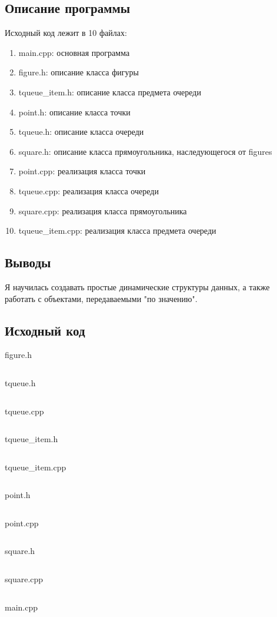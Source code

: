 \documentclass[12pt]{article}
\begin{document}
\subsection*{Описание программы}

Исходный код лежит в 10 файлах:
\begin{enumerate}
\item main.cpp: основная программа

\item figure.h:    описание класса фигуры
\item tqueue\_item.h:    описание класса предмета очереди
\item point.h:     описание класса точки
\item tqueue.h:  описание класса очереди
\item square.h: описание класса прямоугольника, наследующегося от figures

\item point.cpp:     реализация класса точки
\item tqueue.cpp:  реализация класса очереди
\item square.cpp: реализация класса прямоугольника
\item tqueue\_item.cpp:    реализация класса предмета очереди

\end{enumerate}

\subsection*{Выводы}

Я научилась создавать простые динамические структуры данных, а также работать с объектами, передаваемыми "по значению".
\pagebreak



\subsection*{Исходный код}

{\Huge figure.h}
\inputminted{C++}{figure.h}
\pagebreak

{\Huge tqueue.h}
\inputminted{C++}{tqueue.h}
\pagebreak

{\Huge tqueue.cpp}
\inputminted{C++}{tqueue.cpp}
\pagebreak

{\Huge tqueue\_item.h}
\inputminted{C++}{tqueueitem.h}
\pagebreak

{\Huge tqueue\_item.cpp}
\inputminted{C++}{tqueueitem.cpp}
\pagebreak
    
{\Huge point.h}
\inputminted{C++}{point.h}
    \pagebreak

{\Huge point.cpp}
\inputminted{C++}{point.cpp}
    \pagebreak

{\Huge square.h}
\inputminted{C++}{square.h}
\pagebreak

{\Huge square.cpp}
\inputminted{C++}{square.cpp}
\pagebreak
    
{\Huge main.cpp}
\inputminted{C++}{main.cpp}
    \pagebreak
    
\end{document}
